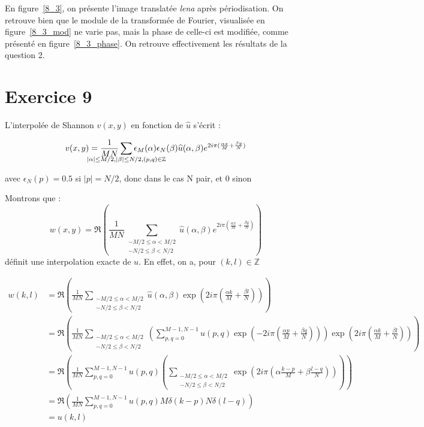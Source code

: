 \documentclass[12pt,a4paper,onecolumn]{article}
\begin{document}
En figure~\ref{8_3}, on présente l'image translatée \textit{lena} après périodisation. On retrouve bien que le module de la transformée de Fourier, visualisée en figure~\ref{8_3_mod} ne varie pas, mais la phase de celle-ci est modifiée, comme présenté en figure~\ref{8_3_phase}. On retrouve effectivement les résultats de la question 2.

\clearpage

\section{Exercice 9}

L'interpolée de Shannon \(v(x,y)\) en fonction de \(\widehat{u}\) s'écrit :

\begin{equation}
	v(x,y) = \frac{1}{MN}\sum_{\mathclap{{|\alpha| \le M/2, |\beta| \le N/2, (p,q) \in \mathbb{Z}}}}\epsilon_M(\alpha)\epsilon_N(\beta)\widehat{u}(\alpha, \beta)  e^{2i\pi(\frac{\alpha x}{M} + \frac{\beta y}{N})}
\end{equation}

avec \(\epsilon_N(p) = 0.5\) si \(|p| = N/2\), donc dans le cas N pair, et 0 sinon

Montrons que :
\begin{equation}
	w(x,y) = \Re\left(\frac{1}{MN}\sum_{\substack{-M/2 \le \alpha < M/2\\ -N/2 \le \beta < N/2}} \widehat{u}(\alpha, \beta) e^{2i\pi(\frac{\alpha x}{M} + \frac{\beta y}{N})} \right)
\end{equation}
définit une interpolation exacte de \(u\).
En effet, on a, pour \((k,l) \in \mathbb{Z}\)

\begin{equation}
	\begin{split}
		w(k,l) &= \Re\left(\frac{1}{MN}\sum_{\substack{-M/2 \le \alpha < M/2\\ -N/2 \le \beta < N/2}}  \widehat{u}(\alpha, \beta) \exp\left(2i\pi(\frac{\alpha k}{M} + \frac{\beta l}{N})\right) \right) \\
		&= \Re\left(\frac{1}{MN}\sum_{\substack{-M/2 \le \alpha < M/2\\ -N/2 \le \beta < N/2}}  \left( \sum_{p, q = 0}^{M-1, N-1}u(p, q)\exp\left(-2i\pi(\frac{\alpha p}{M} + \frac{\beta q}{N})\right)\right) \exp\left(2i\pi(\frac{\alpha k}{M} + \frac{\beta l}{N})\right) \right)\\
		&= \Re\left(\frac{1}{MN} \sum_{p, q = 0}^{M-1, N-1}u(p, q) \left( \sum_{\substack{-M/2 \le \alpha < M/2\\ -N/2 \le \beta < N/2}} \exp\left(2i\pi(\alpha \frac{k - p}{M} + \beta\frac{l-q}{N})\right)\right)\right)\\
		&= \Re\left(\frac{1}{MN} \sum_{p, q = 0}^{M-1, N-1}u(p, q) M\delta(k-p)N\delta(l-q)\right)\\
		&= u(k,l)
	\end{split}
\end{equation}
\end{document}
